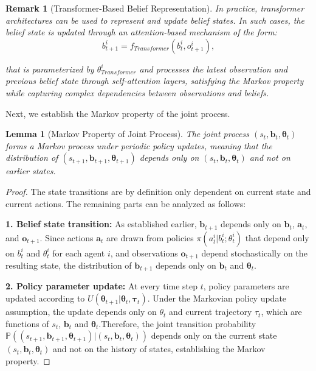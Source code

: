 \documentclass[a4paper,12pt]{report}
\newtheorem{lemma}{Lemma}
\newtheorem{remark}{Remark}
\begin{document}
\begin{remark}[Transformer-Based Belief Representation]
    In practice, transformer architectures can be used to represent and
    update belief states. In such cases, the belief state is updated
    through an attention-based mechanism of the form:
    \begin{equation}
        b_{t+1}^{i} = f_{{Transformer}}(b_{t}^{i}, o_{t+1}^{i}),
    \end{equation}

    that is parameterized by $\theta_{Transformer}^{i}$ and processes the latest
    observation and previous belief state through self-attention layers, satisfying the Markov property
    while capturing complex dependencies between observations and beliefs.
\end{remark}
Next, we establish the Markov property of the joint process.
\begin{lemma}[Markov Property of Joint Process]
    The joint process $(s_{t}, \boldsymbol{b}_{t}, \boldsymbol{\theta}_{t})$ forms
    a Markov process under periodic policy updates, meaning that the distribution
    of $(s_{t+1}, \boldsymbol{b}_{t+1}, \boldsymbol{\theta}_{t+1})$ depends only
    on $(s_{t}, \boldsymbol{b}_{t}, \boldsymbol{\theta}_{t})$ and not on earlier
    states.
\end{lemma}
\begin{proof}
    The state transitions are by definition only dependent on current state and current
    actions. The remaining parts can be analyzed as follows:

    \textbf{1. Belief
        state transition:} As established earlier, $\boldsymbol{b}_{t+1}$ depends only
    on $\boldsymbol{b}_{t}$, $\boldsymbol{a}_{t}$, and $\boldsymbol{o}_{t+1}$. Since
    actions $\boldsymbol{a}_{t}$ are drawn from policies $\pi(a_{t}^{i}|b_{t}^{i};
        \theta_{t}^{i})$ that depend only on $b_{t}^{i}$ and $\theta_{t}^{i}$ for each
    agent $i$, and observations $\boldsymbol{o}_{t+1}$ depend stochastically on
    the resulting state, the distribution of $\boldsymbol{b}_{t+1}$ depends only on
    $\boldsymbol{b}_{t}$ and $\boldsymbol{\theta}_{t}$.

    \textbf{2. Policy parameter
        update:} At every time step $t$, policy parameters are updated according to $U(
        \boldsymbol{\theta}_{t+1}|\boldsymbol{\theta}_{t}, \boldsymbol{\tau}_{t})$.
    Under the Markovian policy update assumption, the update depends only on $\theta
        _{t}$ and current trajectory $\tau_{t}$, which are functions of $s_{t}$, $\boldsymbol
        {b}_{t}$ and $\boldsymbol{\theta}_{t}$.Therefore, the joint transition
    probability
    $\mathbb{P}((s_{t+1}, \boldsymbol{b}_{t+1}, \boldsymbol{\theta}_{t+1})|(s_{t}, \boldsymbol
        {b}_{t}, \boldsymbol{\theta}_{t}))$
    depends only on the current state
    $(s_{t}, \boldsymbol{b}_{t}, \boldsymbol{\theta}_{t})$ and not on the history
    of states, establishing the Markov property.
\end{proof}
\end{document}
